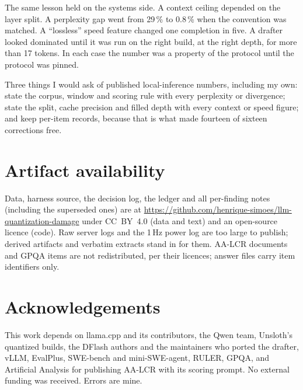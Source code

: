 The same lesson held on the systems side. A context ceiling depended on the layer split. A perplexity
gap went from 29\,\% to 0.8\,\% when the convention was matched. A ``lossless'' speed feature changed one
completion in five. A drafter looked dominated until it was run on the right build, at the right depth,
for more than 17 tokens. In each case the number was a property of the protocol until the protocol
was pinned.

Three things I would ask of published local-inference numbers, including my own: state the corpus,
window and scoring rule with every perplexity or divergence; state the split, cache precision and
filled depth with every context or speed figure; and keep per-item records, because that is what made
fourteen of sixteen corrections free.

\section*{Artifact availability}
Data, harness source, the decision log, the ledger and all per-finding notes (including the superseded
ones) are at \url{https://github.com/henrique-simoes/llm-quantization-damage} under CC~BY~4.0 (data
and text) and an open-source licence (code). Raw server logs and the 1\,Hz power log are too large to
publish; derived artifacts and verbatim extracts stand in for them. AA-LCR documents and GPQA items are
not redistributed, per their licences; answer files carry item identifiers only.

\section*{Acknowledgements}
This work depends on llama.cpp and its contributors, the Qwen team, Unsloth's quantized builds, the
DFlash authors and the maintainers who ported the drafter, vLLM, EvalPlus, SWE-bench and
mini-SWE-agent, RULER, GPQA, and Artificial Analysis for publishing AA-LCR with its scoring prompt. No
external funding was received. Errors are mine.
